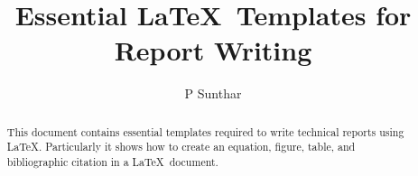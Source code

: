 \documentclass[seminar,twoside]{iitbreport}
\begin{document}
\title{Essential \LaTeX\ Templates for Report Writing}
\author{P Sunthar}

\maketitle

\begin{abstract}
This document contains essential templates required to write technical
reports using \LaTeX.  Particularly it shows how to create an
equation, figure, table, and bibliographic citation in a \LaTeX\
document.
\end{abstract}

\tableofcontents

\listoftables
\listoffigures

\cleardoublepage
\setcounter{page}{1}







\end{document}
